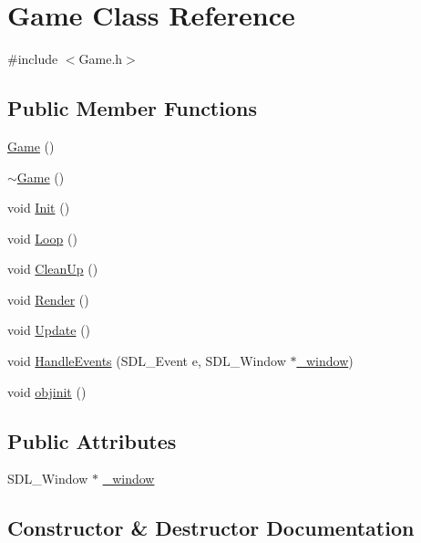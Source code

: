 \hypertarget{class_game}{}\section{Game Class Reference}
\label{class_game}


{\ttfamily \#include $<$Game.\+h$>$}

\subsection*{Public Member Functions}
\begin{DoxyCompactItemize}
\item 
\hyperlink{class_game_ad59df6562a58a614fda24622d3715b65}{Game} ()
\item 
\hyperlink{class_game_ae3d112ca6e0e55150d2fdbc704474530}{$\sim$\+Game} ()
\item 
void \hyperlink{class_game_a555a9e4719fd49971765a2ab8b090b5c}{Init} ()
\item 
void \hyperlink{class_game_a28d8a0a65bda89be42d9c46fc2e4f14b}{Loop} ()
\item 
void \hyperlink{class_game_afe8f2a4980f240bbfba8c1f495ff5075}{Clean\+Up} ()
\item 
void \hyperlink{class_game_a0897730fc9fed789f6c0f11d21a0c14a}{Render} ()
\item 
void \hyperlink{class_game_a1c5373c68261c54aff03e6abe40fee52}{Update} ()
\item 
void \hyperlink{class_game_a6b7a69223477dbfae5f570763385a2f1}{Handle\+Events} (S\+D\+L\+\_\+\+Event e, S\+D\+L\+\_\+\+Window $\ast$\hyperlink{class_game_ac93b435b5da2f81e01da94a2871c1394}{\+\_\+window})
\item 
void \hyperlink{class_game_a7b9c3ffde53cdf3fa685d6e9b5ae43f3}{objinit} ()
\end{DoxyCompactItemize}
\subsection*{Public Attributes}
\begin{DoxyCompactItemize}
\item 
S\+D\+L\+\_\+\+Window $\ast$ \hyperlink{class_game_ac93b435b5da2f81e01da94a2871c1394}{\+\_\+window}
\end{DoxyCompactItemize}


\subsection{Constructor \& Destructor Documentation}
\hypertarget{class_game_ad59df6562a58a614fda24622d3715b65}{}
